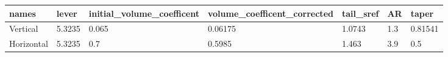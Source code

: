 \begin{tabular}{lllllll}
names & lever & initial_volume_coefficent & volume_coefficent_corrected & tail_sref & AR & taper \\ 
\hline 
Vertical & 5.3235 & 0.065 & 0.06175 & 1.0743 & 1.3 & 0.81541 \\ 
Horizontal & 5.3235 & 0.7 & 0.5985 & 1.463 & 3.9 & 0.5 \\ 
\hline 
\end{tabular}